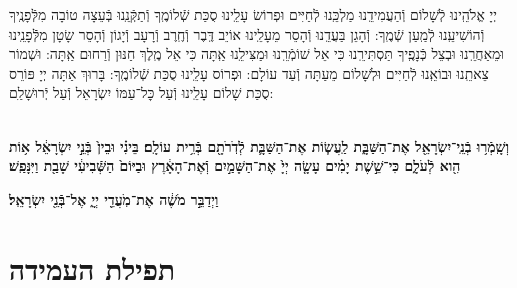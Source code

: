 \documentclass[twoside, openany, parskip=half, 11pt]{book}
\begin{document}
\barachu

\hamaarivaravim

\ahavasolam

\shema

\veahavta

\vehaya

\vayomer{}

\emesveemuna

 יְיָ אֱלֹהֵֽינוּ לְֿשָׁלוֹם וְֿהַעֲמִידֵֽנוּ מַלְכֵּֽנוּ לְֿחַיִּים וּפְרוֹשׂ עָלֵֽינוּ סֻכַּת שְֿׁלוֹמֶֽךָ וְֿתַקְּֿנֵֽנוּ בְּֿעֵצָה טוֹבָה מִלְּֿפָנֶֽיךָ וְֿהוֹשִׁיעֵֽנוּ לְֿמַֽעַן שְֿׁמֶֽךָ: וְֿהָגֵן בַּעֲדֵֽנוּ וְֿהָסֵר מֵעָלֵֽינוּ אוֹיֵב דֶּֽבֶר וְֿחֶֽרֶב וְֿרָעָב וְֿיָגוֹן וְֿהָסֵר שָׂטָן מִלְּֿֿפָנֵֽינוּ וּמֵאַחֲרֵֽנוּ וּבְצֵל כְּֿנָפֶֽיךָ תַּסְתִּירֵֽנוּ כִּי אֵל שׁוֹמְֿרֵֽנוּ וּמַצִּילֵֽנוּ אַֽתָּה כִּי אֵל מֶֽלֶךְ חַנּוּן וְֿרַחוּם אַֽתָּה: וּשְׁמוֹר צֵאתֵֽנוּ וּבוֹאֵֽנוּ לְֿחַיִּים וּלְשָׁלוֹם מֵעַתָּה וְֿעַד עוֹלָם: וּפְרוֹס עָלֵֽינוּ סֻכַּת שְֿׁלוֹמֶֽךָ: בָּרוּךְ אַתָּה יְיָ פּוֹרֵס סֻכַּת שָׁלוֹם עָלֵֽינוּ וְֿעַל כׇּל־עַמּוֹ יִשְׂרָאֵל וְֿעַל יְֿרוּשָׁלַ‍ִם:

\\
\textbf{וְשָֽׁמְֿר֥וּ בְֿנֵֽי־יִשְׂרָאֵ֖ל אֶת־הַשַּׁבָּ֑ת
 לַֽעֲשׂ֧וֹת אֶת־הַשַּׁבָּ֛ת לְֿדֹֽרֹתָ֖ם בְּֿרִ֥ית עוֹלָֽם׃ בֵּינִ֗י וּבֵין֙ בְּֿנֵ֣י יִשְׂרָאֵ֔ל א֥וֹת הִ֖וא לְֿעֹלָ֑ם כִּי־שֵׁ֣שֶׁת יָמִ֗ים עָשָׂ֤ה יְיָ֙
אֶת־הַשָּׁמַ֣יִם וְֿאֶת־הָאָ֔רֶץ וּבַיּוֹם֙ הַשְּֿׁבִיעִ֔י שָׁבַ֖ת וַיִּנָּפַֽשׁ׃
}

\textbf{
וַיְדַבֵּ֣ר מֹשֶׁ֔ה אֶת־מֹֽעֲדֵ֖י יְיָ֑ אֶל־בְּֿֿנֵ֖י יִשְׂרָאֵֽל׃
}



\halfkaddish

\section[תפילת העמידה]{ תפילת העמידה }

\newcommand{\shabbosshuva}{בשבת שובה:}


\newcommand{\shabboskiddushhashem}{
\firstword{אַתָּה קָדוֹשׁ}
 וְֿשִׁמְךָ קָדוֹשׁ וּקְדוֹשִׁים בְּֿכׇל־יוֹם יְֿהַלְלוּךָ סֶּֽלָה: בָּרוּךְ אַתָּה יְיָ *הָאֵל
(*\instruction{בשבת שובה:}
הַמֶּֽלֶךְ)
 הַקָּדוֹשׁ:
}


\newcommand{\shabboskiddushhayom}[1]{{
\firstword{אֱלֹהֵינוּ}
 וֵאלֹהֵי אֲבוֹתֵינוּ רְֿצֵה בִמְנוּחָתֵנוּ קַדְּֿשֵׁנוּ בְּֿמִצְוֹתֶיךָ וְֿתֵן חֶלְקֵנוּ בְּֿתוֹרָתֶךָ שַׂבְּֿעֵנוּ מִטּוּבֶךָ וְֿשַׂמְּֿחֵנוּ בִּישׁוּעָתֶךָ וְֿטַהֵר לִבֵּנוּ לְֿעׇבְדְּֿךָ בֶּאֱמֶת: וְֿהַנְחִילֵנוּ יְיָ אֱלֹהֵינוּ בְּֿאַהֲבָה וּבְרָצוֹן שַׁבַּת קׇדְשֶׁךָ וְיָנוּחוּ בָהּ#1 יִשְׂרָאֵל מְקַדְּשֵׁי שְׁמֶךָ:
 בָּרוּךְ אַתָּה יְיָ מְֿקַדֵּשׁ הַשַּׁבָּת:
 }}
\end{document}
